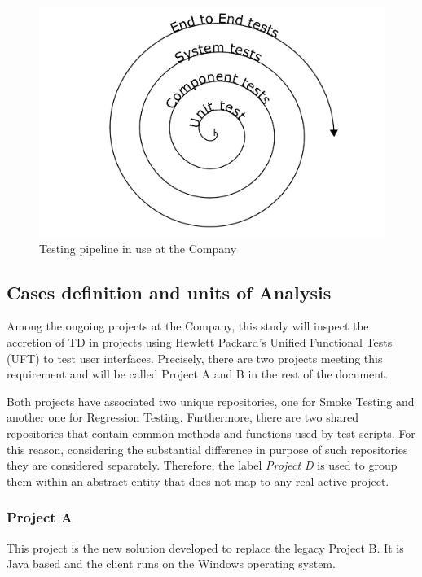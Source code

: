 
\begin{figure}[hbt]
    \centering
    \includegraphics[width=\textwidth]{figure/testing_pipeline.pdf}
    \caption{Testing pipeline in use at the Company}
    \label{fig:testing_pipeline}
\end{figure}

\subsection{Cases definition and units of Analysis}

Among the ongoing projects at the Company, this study will inspect the accretion of TD in projects using Hewlett Packard's Unified Functional Tests (UFT) to test user interfaces. Precisely, there are two projects meeting this requirement and will be called Project A and B in the rest of the document.

Both projects have associated two unique repositories, one for Smoke Testing and another one for Regression Testing. Furthermore, there are two shared repositories that contain common methods and functions used by test scripts. For this reason, considering the substantial difference in purpose of such repositories they are considered separately. Therefore, the label \textit{Project D} is used to group them within an abstract entity that does not map to any real active project.


\subsubsection{Project A}
This project is the new solution developed to replace the legacy Project B. It is Java based and the client runs on the Windows operating system.

